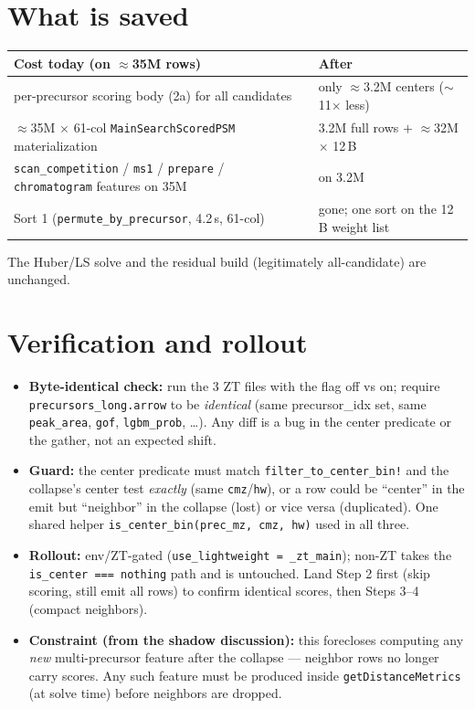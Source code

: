 \documentclass[11pt]{article}
\newcommand{\code}[1]{\texttt{\small #1}}
\begin{document}
\section{What is saved}

\begin{center}
\begin{tabular}{p{} p{}}
\toprule
Cost today (on $\approx$35M rows) & After \\
\midrule
per-precursor scoring body (2a) for all candidates & only $\approx$3.2M centers ($\sim$11$\times$ less) \\
$\approx$35M $\times$ 61-col \code{MainSearchScoredPSM} materialization & 3.2M full rows $+$ $\approx$32M $\times$ 12\,B \\
\code{scan\_competition} / \code{ms1} / \code{prepare} / \code{chromatogram} features on 35M & on 3.2M \\
Sort 1 (\code{permute\_by\_precursor}, 4.2\,s, 61-col) & gone; one sort on the 12\,B weight list \\
\bottomrule
\end{tabular}
\end{center}
The Huber/LS solve and the residual build (legitimately all-candidate) are unchanged.

\section{Verification and rollout}

\begin{itemize}
\item \textbf{Byte-identical check:} run the 3 ZT files with the flag off vs on; require
\code{precursors\_long.arrow} to be \emph{identical} (same precursor\_idx set, same
\code{peak\_area}, \code{gof}, \code{lgbm\_prob}, \dots). Any diff is a bug in the
center predicate or the gather, not an expected shift.
\item \textbf{Guard:} the center predicate must match \code{filter\_to\_center\_bin!}
and the collapse's center test \emph{exactly} (same \code{cmz}/\code{hw}), or a row could
be ``center'' in the emit but ``neighbor'' in the collapse (lost) or vice versa
(duplicated). One shared helper \code{is\_center\_bin(prec\_mz, cmz, hw)} used in all three.
\item \textbf{Rollout:} env/ZT-gated (\code{use\_lightweight = \_zt\_main}); non-ZT takes
the \code{is\_center === nothing} path and is untouched. Land Step 2 first (skip scoring,
still emit all rows) to confirm identical scores, then Steps 3--4 (compact neighbors).
\item \textbf{Constraint (from the shadow discussion):} this forecloses computing any
\emph{new} multi-precursor feature after the collapse --- neighbor rows no longer carry
scores. Any such feature must be produced inside \code{getDistanceMetrics} (at solve
time) before neighbors are dropped.
\end{itemize}
\end{document}
